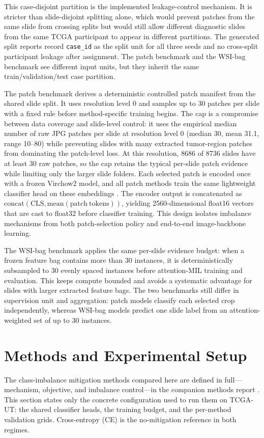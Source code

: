 \documentclass[11pt]{article}
\begin{document}
This case-disjoint partition is the implemented leakage-control mechanism. It is stricter than slide-disjoint splitting alone, which would prevent patches from the same slide from crossing splits but would still allow different diagnostic slides from the same TCGA participant to appear in different partitions. The generated split reports record \texttt{case\_id} as the split unit for all three seeds and no cross-split participant leakage after assignment. The patch benchmark and the WSI-bag benchmark see different input units, but they inherit the same train/validation/test case partition.

The patch benchmark derives a deterministic controlled patch manifest from the shared slide split. It uses resolution level 0 and samples up to 30 patches per slide with a fixed rule before method-specific training begins. The cap is a compromise between data coverage and slide-level control: it uses the empirical median number of raw JPG patches per slide at resolution level 0 (median 30, mean \num{31.1}, range 10--80) while preventing slides with many extracted tumor-region patches from dominating the patch-level loss. At this resolution, \num{8686} of \num{8736} slides have at least 30 raw patches, so the cap retains the typical per-slide patch evidence while limiting only the larger slide folders. Each selected patch is encoded once with a frozen Virchow2 model, and all patch methods train the same lightweight classifier head on these embeddings \citep{zimmermann2024virchow2,vorontsov2024virchow}. The encoder output is concatenated as $\mathrm{concat}(\mathrm{CLS}, \mathrm{mean}(\mathrm{patch\ tokens}))$, yielding \num{2560}-dimensional float16 vectors that are cast to float32 before classifier training. This design isolates imbalance mechanisms from both patch-selection policy and end-to-end image-backbone learning.

The WSI-bag benchmark applies the same per-slide evidence budget: when a frozen feature bag contains more than 30 instances, it is deterministically subsampled to 30 evenly spaced instances before attention-MIL training and evaluation. This keeps compute bounded and avoids a systematic advantage for slides with larger extracted feature bags. The two benchmarks still differ in supervision unit and aggregation: patch models classify each selected crop independently, whereas WSI-bag models predict one slide label from an attention-weighted set of up to 30 instances.

\section{Methods and Experimental Setup}
\label{sec:methods}
The class-imbalance mitigation methods compared here are defined in full---mechanism, objective, and imbalance control---in the companion methods report \citep{queisler2026imbalanceMethods}. This section states only the concrete configuration used to run them on TCGA-UT: the shared classifier heads, the training budget, and the per-method validation grids. Cross-entropy (CE) is the no-mitigation reference in both regimes.
\end{document}
